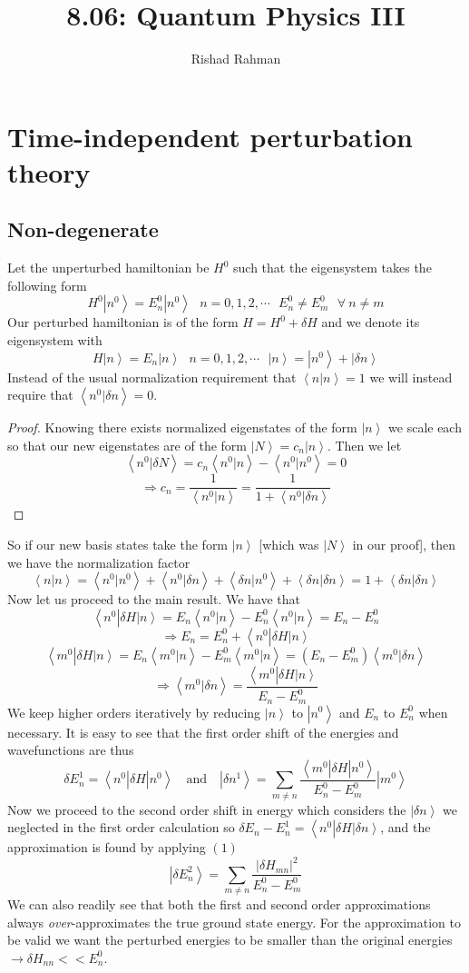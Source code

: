 \documentclass{article}
\newcommand{\mktitle}[1]{\title{#1} \author{Rishad Rahman} \date{} \maketitle}
\newcommand{\bra}[1]{\left\langle #1 \right|}
\newcommand{\ket}[1]{\left|#1\right\rangle}
\newcommand{\braket}[2]{\left\langle#1 |  #2\right\rangle}
\begin{document}
\mktitle{8.06: Quantum Physics III} 

\section{Time-independent perturbation theory}
\subsection{Non-degenerate}
Let the unperturbed hamiltonian be $H^0$ such that the eigensystem takes the following form
$$ H^0 \ket{n^0} = E^0_n \ket{n^0} \ \ \ n = 0,1,2, \cdots \ \ \ E^0_n \neq E^0_m \ \ \ \forall \ n\neq m$$
Our perturbed hamiltonian is of the form $H=H^0+\delta H$ and we denote its eigensystem with 
$$ H \ket{n} = E_n \ket{n} \ \ \ n = 0,1,2, \cdots \ \ \ \ket{n}=\ket{n^0} + \ket{\delta n}$$
Instead of the usual normalization requirement that $\braket{n}{n}=1$ we will instead require that $\braket{n^0}{\delta n} = 0$.
\begin{proof}
Knowing there exists normalized eigenstates of the form $\ket{n}$  we scale each so that our new eigenstates are of the form $\ket{N} = c_n\ket{n}$. Then we let $$\braket{n^0}{\delta N} = c_n\braket{n^0}{n} - \braket{n^0}{n^0} = 0$$ $$ \Rightarrow c_n = \frac{1}{\braket{n^0}{n}} = \frac{1}{1+\braket{n^0}{\delta n}}$$
\end{proof} \noindent
So if our new basis states take the form $\ket{n}$ [which was $\ket{N}$ in our proof], then we have the normalization factor $$\braket{n}{n} = \braket{n^0}{n^0} + \braket{n^0}{\delta n}+\braket{\delta n}{n^0} + \braket{\delta n}{\delta n} = 1+\braket{\delta n}{\delta n}$$
Now let us proceed to the main result. We have that $$\bra{n^0} \delta H \ket{n} = E_n \braket{n^0}{n} -  E_n^0 \braket{n^0}{n} = E_n - E_n^0 $$ $$\Rightarrow E_n = E_n^0 + \bra{n^0}{\delta H}\ket{n}$$
$$\bra{m^0} \delta H \ket{n} = E_n \braket{m^0}{n} -  E_m^0 \braket{m^0}{n} = (E_n-E_m^0)\braket{m^0}{\delta n}
$$ $$\Rightarrow \braket{m^0}{\delta n} = \frac{\bra{m^0} \delta H \ket{n}}{E_n - E_m^0}$$
We keep higher orders iteratively by reducing $\ket{n}$ to $\ket{n^0}$ and $E_n$ to $E_n^0$ when necessary. It is easy to see that the first order shift of the energies and wavefunctions are thus
\begin{equation} \boxed{\delta E_n^1 = \bra{n^0} \delta H \ket{n^0} \quad \text{and} \quad \ket{\delta n^1} = \sum_{m\neq n} \frac{\bra{m^0} \delta H \ket{n^0}}{E_n^0 - E^0_m}\ket{m^0}}
\end{equation}
Now we proceed to the second order shift in energy which considers the $\ket{\delta n}$ we neglected in the first order calculation so $\delta E_n - E_n^1 = \bra{n^0} \delta H \ket{\delta n}$, and the approximation is found by applying $(1)$
\begin{equation}
\boxed{\ket{\delta E_n^2} = \sum_{m\neq n} \frac{|\delta H_{mn}|^2}{E_n^0-E_m^0}}
\end{equation}
We can also readily see that both the first and second order approximations always \emph{over}-approximates the true ground state energy. For the approximation to be valid we want the perturbed energies to be smaller than the original energies $\rightarrow \boxed{\delta H_{nn} << E_n^0}$.
\end{document}
